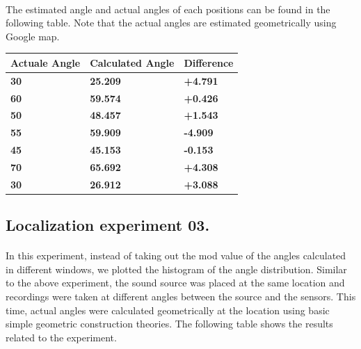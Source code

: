 \documentclass[12pt]{article}
\numberwithin{figure}{section}
\numberwithin{table}{section}
\begin{document}
\paragraph{}
The estimated angle and actual angles of each positions can be found in the following table. Note that the actual angles are estimated geometrically using Google map.

\begin{table}[H]
\centering
\begin{tabular}{|m{}|m{}|m{}|} 
\hline
\bf {Actuale Angle} &  {\bf{ Calculated Angle }} & {\bf{ Difference }}\\
\hline
\hline
\bf {30} &  {\bf{ 25.209  }} & {\bf{ +4.791 }}\\
\hline
\bf {60} &  {\bf{ 59.574 }} & {\bf{ +0.426 }}\\
\hline
\bf {50} &  {\bf{ 48.457 }} & {\bf{ +1.543 }}\\
\hline
\bf {55} &  {\bf{ 59.909 }} & {\bf{ -4.909 }}\\
\hline
\bf {45} &  {\bf{ 45.153 }} & {\bf{ -0.153 }}\\
\hline
\bf {70} &  {\bf{ 65.692 }} & {\bf{ +4.308 }}\\
\hline
\bf {30} &  {\bf{ 26.912 }} & {\bf{ +3.088 }}\\
\hline
\end{tabular}
\end{table}

\newpage
\subsection{Localization experiment 03.}

\paragraph{}
In this experiment, instead of taking out the mod value of the angles calculated in different windows, we plotted the histogram of the angle distribution. Similar to the above experiment, the sound source was placed at the same location and recordings were taken at different angles between the source and the sensors. This time, actual angles were calculated geometrically at the location using basic simple geometric construction theories. The following table shows the results related to the experiment.
\end{document}
